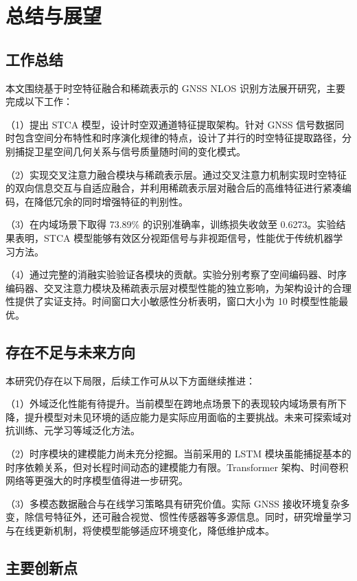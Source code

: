 \chapter{总结与展望}

\section{工作总结}

本文围绕基于时空特征融合和稀疏表示的 GNSS NLOS 识别方法展开研究，主要完成以下工作：

（1）提出 STCA 模型，设计时空双通道特征提取架构。针对 GNSS 信号数据同时包含空间分布特性和时序演化规律的特点，设计了并行的时空特征提取路径，分别捕捉卫星空间几何关系与信号质量随时间的变化模式。

（2）实现交叉注意力融合模块与稀疏表示层。通过交叉注意力机制实现时空特征的双向信息交互与自适应融合，并利用稀疏表示层对融合后的高维特征进行紧凑编码，在降低冗余的同时增强特征的判别性。

（3）在内域场景下取得 73.89\% 的识别准确率，训练损失收敛至 0.6273。实验结果表明，STCA 模型能够有效区分视距信号与非视距信号，性能优于传统机器学习方法。

（4）通过完整的消融实验验证各模块的贡献。实验分别考察了空间编码器、时序编码器、交叉注意力模块及稀疏表示层对模型性能的独立影响，为架构设计的合理性提供了实证支持。时间窗口大小敏感性分析表明，窗口大小为 10 时模型性能最优。

\section{存在不足与未来方向}

本研究仍存在以下局限，后续工作可从以下方面继续推进：

（1）外域泛化性能有待提升。当前模型在跨地点场景下的表现较内域场景有所下降，提升模型对未见环境的适应能力是实际应用面临的主要挑战。未来可探索域对抗训练、元学习等域泛化方法。

（2）时序模块的建模能力尚未充分挖掘。当前采用的 LSTM 模块虽能捕捉基本的时序依赖关系，但对长程时间动态的建模能力有限。Transformer 架构、时间卷积网络等更强大的时序模型值得进一步研究。

（3）多模态数据融合与在线学习策略具有研究价值。实际 GNSS 接收环境复杂多变，除信号特征外，还可融合视觉、惯性传感器等多源信息。同时，研究增量学习与在线更新机制，将使模型能够适应环境变化，降低维护成本。

\section{主要创新点}

